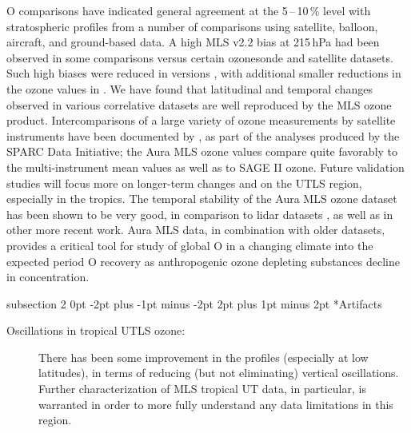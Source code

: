 \documentclass[11pt,draft]{report}
\makeatletter
\renewcommand{\subsection}{\@startsection%
  {subsection}%
  {2}%
  {0pt}%
  {-2pt plus -1pt minus -2pt}%
  {2pt plus 1pt minus 2pt}%
  {\large\sffamily\fontseries{sb}\selectfont\flushleft\color{SectionColor}\figureversion{tabular}}}%
\makeatother
\begin{document}
O comparisons have indicated general agreement at the 5\,--\,10\,\%
level with stratospheric profiles from a number of comparisons using
satellite, balloon, aircraft, and ground-based data.  A high MLS v2.2
bias at 215\,hPa had been observed in some comparisons versus certain
ozonesonde and satellite datasets. Such high biases were reduced in
versions \prevv, with additional smaller reductions in the
ozone values in \thisv.  We have found that latitudinal and temporal
changes observed in various correlative datasets are well reproduced by
the MLS ozone product.  Intercomparisons of a large variety of ozone
measurements by satellite instruments have been documented by
\citet{TegtmeierEtal13}, as part of the analyses produced by the SPARC
Data Initiative; the Aura MLS ozone values compare quite favorably to
the multi-instrument mean values as well as to SAGE II ozone. Future
validation studies will focus more on longer-term changes and on the
UTLS region, especially in the tropics. The temporal stability of the
Aura MLS ozone dataset has been shown to be very good, in comparison to
lidar datasets \citet{NairEtal12}, as well as in other more recent
work. Aura MLS data, in combination with older datasets, provides a
critical tool for study of global O in a changing climate into
the expected period O recovery as anthropogenic ozone depleting
substances decline in concentration. 

\subsection*{Artifacts} 

\begin{description}  
\item[Oscillations in tropical UTLS ozone:] There has been some improvement 
  in the \thisv profiles (especially at low latitudes), in terms of reducing 
  (but not eliminating) vertical oscillations. Further characterization 
  of MLS tropical UT data, in particular, is warranted
  in order to more fully understand any data limitations in this region.

\end{description}   
 
\end{document}
